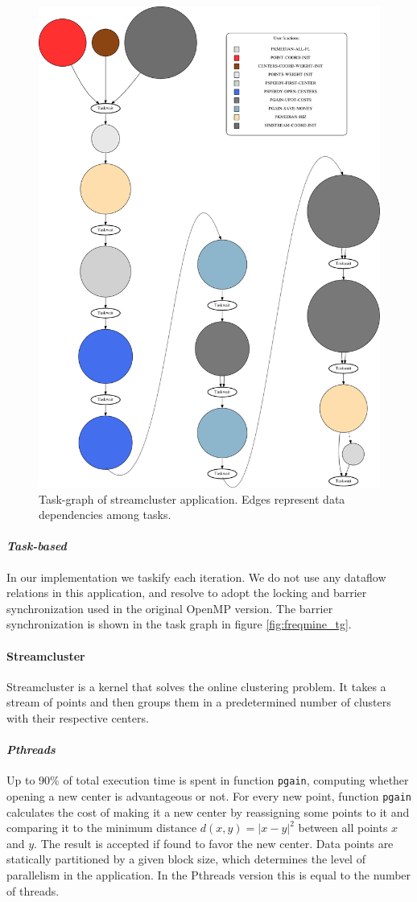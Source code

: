 {\begin{figure}[ht!]%
	\center
	\includegraphics[width=.6\columnwidth]{task_benchmarks/figures/streamcluster_taskgraph}%
	\caption{Task-graph of streamcluster application.  Edges represent data dependencies among
tasks.}
	\label{fig:streamcluster_tg}%
	\vspace{.5cm}
\end{figure}



\paragraph{\textit{Task-based}}
In our implementation we taskify each iteration. We do not use any dataflow relations in this application, and resolve to 
adopt the locking and barrier synchronization used in the original OpenMP version.
The barrier synchronization is shown in the task graph in figure \ref{fig:freqmine_tg}.

\paragraph{\textbf{Streamcluster}}
Streamcluster is a kernel that solves the online clustering problem. 
It takes a stream of points and then groups them in a predetermined number of clusters with their respective centers.  


\paragraph{\textit{Pthreads}}
Up to 90\% of total execution time is spent in function \texttt{pgain}, 
computing whether opening a new center is advantageous or not.  For every 
new point, function \texttt{pgain} calculates the cost of making it a new center by reassigning some points to it and 
comparing it to the minimum distance $d(x,y) = |{x-y}|^2$ between all points $x$ and $y$.
The result is accepted if found to favor the new center.  Data points are statically partitioned by a given block 
size, which determines the level of parallelism in the application. In the Pthreads version this is equal to the number of
threads. 

}

